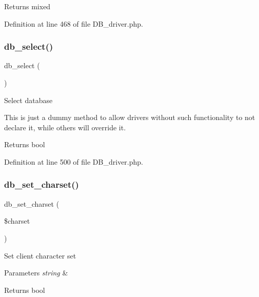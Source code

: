 \begin{DoxyReturn}{Returns}
mixed 
\end{DoxyReturn}


Definition at line 468 of file D\+B\+\_\+driver.\+php.

\mbox{\label{class_c_i___d_b__driver_af0c7f2602586ea2050b19fb36baefb24}} 
\subsubsection{\texorpdfstring{db\_select()}{db\_select()}}
{\footnotesize\ttfamily db\+\_\+select (\begin{DoxyParamCaption}{ }\end{DoxyParamCaption})}

Select database

This is just a dummy method to allow drivers without such functionality to not declare it, while others will override it.

\begin{DoxyReturn}{Returns}
bool 
\end{DoxyReturn}


Definition at line 500 of file D\+B\+\_\+driver.\+php.

\mbox{\label{class_c_i___d_b__driver_a66d47c23180629f6ccea934fd2ab6d0e}} 
\subsubsection{\texorpdfstring{db\_set\_charset()}{db\_set\_charset()}}
{\footnotesize\ttfamily db\+\_\+set\+\_\+charset (\begin{DoxyParamCaption}\item[{}]{\$charset }\end{DoxyParamCaption})}

Set client character set


\begin{DoxyParams}{Parameters}
{\em string} & \\
\hline
\end{DoxyParams}
\begin{DoxyReturn}{Returns}
bool 
\end{DoxyReturn}


